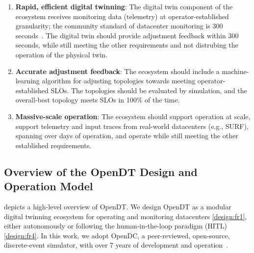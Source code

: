 \begin{enumerate}[label=\textbf{(NFR\arabic*)},leftmargin=0pt,itemindent=3em]
    \item \label{design:nfr1} \textbf{Rapid, efficient digital twinning}: The digital twin component of the ecosystem receives monitoring data (telemetry) at operator-established granularity; the community standard of datacenter monitoring is 300 seconds~\cite{DBLP:conf/ccgrid/MastenbroekAJLB21, nicolae5377101m3sa, DBLP:journals/fgcs/MastenbroekMBI25}. 
    The digital twin should provide adjustment feedback within 300 seconds, while still meeting the other requirements and not distrubing the operation of the physical twin.
    
    \item \label{design:nfr2} \textbf{Accurate adjustment feedback}: The ecosystem should include a machine-learning algorithm for adjusting topologies towards meeting operator-established SLOs. The topologies should be evaluated by simulation, and the overall-best topology meets SLOs in 100\% of the time. 
    
    \item \label{design:nfr3} \textbf{Massive-scale operation}: The ecosystem should support operation at scale, support telemetry and input traces from real-world datacenters (e.g., SURF), spanning over days of operation, and operate while still meeting the other established requirements.
\end{enumerate}



\subsection{Overview of the OpenDT Design and Operation Model}\label{sec:design:choices}
 depicts a high-level overview of OpenDT. We design OpenDT as a modular digital twinning ecosystem for operating and monitoring datacenters \ref{design:fr1}, either autonomously or following the human-in-the-loop paradigm (HITL) \ref{design:fr4}. In this work, we adopt OpenDC, a peer-reviewed, open-source, discrete-event simulator, with over 7 years of development and operation~\cite{DBLP:conf/ccgrid/MastenbroekAJLB21, DBLP:journals/fgcs/MastenbroekMBI25, nicolae5377101m3sa}.

